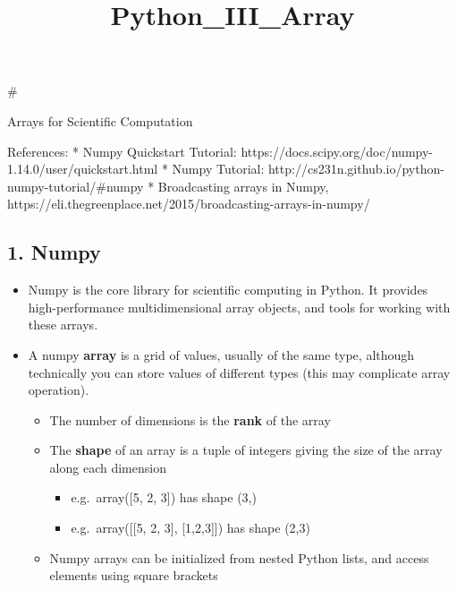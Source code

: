 \documentclass[11pt]{article}
\title{Python\_III\_Array}
\providecommand{\tightlist}{%
      \setlength{\itemsep}{0pt}\setlength{\parskip}{0pt}}
\begin{document}
    
    
    \maketitle
    
    

    
    \#

Arrays for Scientific Computation

References: * Numpy Quickstart Tutorial:
https://docs.scipy.org/doc/numpy-1.14.0/user/quickstart.html * Numpy
Tutorial: http://cs231n.github.io/python-numpy-tutorial/\#numpy *
Broadcasting arrays in Numpy,
https://eli.thegreenplace.net/2015/broadcasting-arrays-in-numpy/

    \hypertarget{numpy}{%
\subsection{1. Numpy}\label{numpy}}

\begin{itemize}
\item
  Numpy is the core library for scientific computing in Python. It
  provides high-performance multidimensional array objects, and tools
  for working with these arrays.
\item
  A numpy \textbf{array} is a grid of values, usually of the same type,
  although technically you can store values of different types (this may
  complicate array operation).

  \begin{itemize}
  \tightlist
  \item
    The number of dimensions is the \textbf{rank} of the array
  \item
    The \textbf{shape} of an array is a tuple of integers giving the
    size of the array along each dimension

    \begin{itemize}
    \tightlist
    \item
      e.g.~array({[}5, 2, 3{]}) has shape (3,)
    \item
      e.g.~array({[}{[}5, 2, 3{]}, {[}1,2,3{]}{]}) has shape (2,3)
    \end{itemize}
  \item
    Numpy arrays can be initialized from nested Python lists, and access
    elements using square brackets
  \end{itemize}
\end{itemize}
\end{document}
